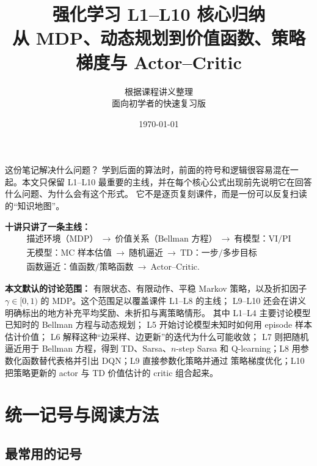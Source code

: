 \documentclass[11pt,a4paper,fontset=fandol]{ctexart}
\title{\textbf{\Huge 强化学习 L1--L10 核心归纳}\\[0.5em]
       \Large 从 MDP、动态规划到价值函数、策略梯度与 Actor--Critic}
\author{根据课程讲义整理\\
        \small 面向初学者的快速复习版}
\date{\today}
\begin{document}
\maketitle
\thispagestyle{empty}

\begin{goalbox}{这份笔记解决什么问题？}
学到后面的算法时，前面的符号和逻辑很容易混在一起。本文只保留 L1--L10
最重要的主线，并在每个核心公式出现前先说明它在回答什么问题、为什么会有这个形式。
它不是逐页复刻课件，而是一份可以反复扫读的“知识地图”。
\end{goalbox}

\vspace{0.5em}

\noindent\textbf{十讲只讲了一条主线：}
\[
\begin{gathered}
\boxed{\text{描述环境（MDP）}}
\ \longrightarrow\
\boxed{\text{价值关系（Bellman 方程）}}
\ \longrightarrow\
\boxed{\text{有模型：VI/PI}}
\\[0.45em]
\boxed{\text{无模型：MC 样本估值}}
\ \longrightarrow\
\boxed{\text{随机逼近}}
\ \longrightarrow\
\boxed{\text{TD：一步/多步目标}}
\\[0.45em]
\boxed{\text{函数逼近：值函数/策略函数}}
\ \longrightarrow\
\boxed{\text{Actor--Critic}} .
\end{gathered}
\]

\noindent\textbf{本文默认的讨论范围：}
有限状态、有限动作、平稳 Markov 策略，以及折扣因子
\(\gamma\in[0,1)\) 的 MDP。这个范围足以覆盖课件 L1--L8 的主线；
L9--L10 还会在讲义明确标出的地方补充平均奖励、未折扣与离策略情形。
其中 L1--L4 主要讨论模型已知时的 Bellman 方程与动态规划；
L5 开始讨论模型未知时如何用 episode 样本估计价值；
L6 解释这种“边采样、边更新”的迭代为什么可能收敛；
L7 则把随机逼近用于 Bellman 方程，得到 TD、Sarsa、\(n\)-step Sarsa
和 Q-learning；L8 用参数化函数替代表格并引出 DQN；L9 直接参数化策略并通过
策略梯度优化；L10 把策略更新的 actor 与 TD 价值估计的 critic 组合起来。

\clearpage
\tableofcontents
\clearpage

\section*{统一记号与阅读方法}

\subsection*{最常用的记号}
\end{document}
